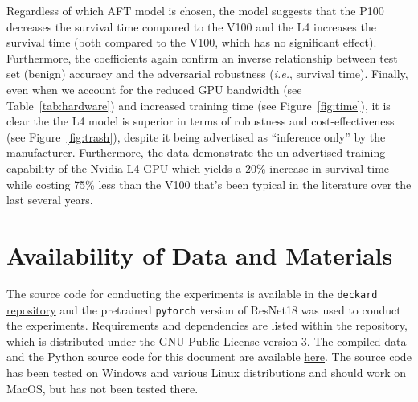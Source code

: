 \documentclass[sn-mathphys-num]{sn-jnl}%
\begin{document}
Regardless of which AFT model is chosen, the model suggests that the P100 decreases the survival time compared to the V100 and the L4 increases the survival time (both compared to the V100, which has no significant effect).
Furthermore, the coefficients again confirm an inverse relationship between test set (benign) accuracy and the adversarial robustness (\textit{i.e.}, survival time).
Finally, even when we account for the reduced GPU bandwidth (see Table~\ref{tab:hardware}) and increased training time (see Figure~\ref{fig:time}), it is clear the the L4 model is superior in terms of robustness and cost-effectiveness (see Figure~\ref{fig:trash}), despite it being advertised as ``inference only'' by the manufacturer.
Furthermore, the data demonstrate the un-advertised training capability of the Nvidia L4 GPU which yields a 20\% increase in survival time while costing 75\% less than the V100 that's been typical in the literature over the last several years.

%
\clearpage
\section{Availability of Data and Materials}
The source code for conducting the experiments is available in the \texttt{deckard} \href{https://github.com/simplymathematics/deckard/tree/main/examples/power}{ repository} and the pretrained \texttt{pytorch} version of ResNet18 was used to conduct the experiments. Requirements and dependencies are listed within the repository, which is distributed under the GNU Public License version 3. The compiled data and the Python source code for this document are available \href{https://github.com/simplymathematics/kepler-ml}{here}. The source code has been tested on Windows and various Linux distributions and should work on MacOS, but has not been tested there.
\printglossary
\clearpage

\end{document}
